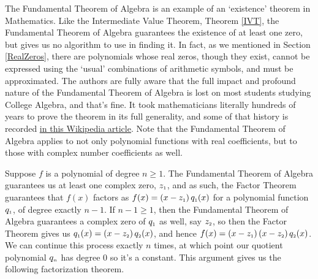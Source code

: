 \medskip

The Fundamental Theorem of Algebra is an example of an `existence' theorem in Mathematics.  Like the Intermediate Value Theorem, Theorem \ref{IVT}, the Fundamental Theorem of Algebra  guarantees the existence of at least one zero, but gives us no algorithm to use in finding it.  In fact, as we mentioned in Section \ref{RealZeros}, there are polynomials whose real zeros, though they exist, cannot be expressed using the `usual' combinations of arithmetic symbols, and must be approximated.  The authors are fully aware that the full impact and profound nature of the Fundamental Theorem of Algebra  is lost on most students studying College Algebra, and that's fine.  It took mathematicians literally hundreds of years to prove the theorem in its full generality, and some of that history is recorded \href{http://en.wikipedia.org/wiki/Fundamental_theorem_of_algebra}{\underline{in this Wikipedia article}}.  Note that the Fundamental Theorem of Algebra  applies to not only polynomial functions with real coefficients, but to those with complex number coefficients as well.  



\smallskip

Suppose  $f$ is a polynomial of degree $n \geq 1$.  The Fundamental Theorem of Algebra guarantees us at least one complex zero, $z_{\mbox{\tiny $1$}}$, and as such, the Factor Theorem guarantees that $f(x)$ factors as $f(x) = \left(x - z_{\mbox{\tiny $1$}}\right) q_{\mbox{\tiny $1$}}(x)$ for a polynomial function $q_{\mbox{\tiny $1$}}$,  of degree exactly $n-1$.  If $n-1 \geq 1$, then the Fundamental Theorem of Algebra guarantees a complex zero of $q_{\mbox{\tiny $1$}}$ as well, say $z_{\mbox{\tiny $2$}}$, so then the Factor Theorem gives us $q_{\mbox{\tiny $1$}}(x) = \left(x - z_{\mbox{\tiny $2$}}\right) q_{\mbox{\tiny $2$}}(x)$, and hence $f(x) = \left(x - z_{\mbox{\tiny $1$}}\right) \left(x - z_{\mbox{\tiny $2$}}\right) q_{\mbox{\tiny $2$}}(x)$.  We can continue this process exactly $n$ times, at which point our quotient polynomial $q_{\mbox{\tiny $n$}}$ has degree $0$ so it's a constant.  This argument gives us the following factorization theorem.

